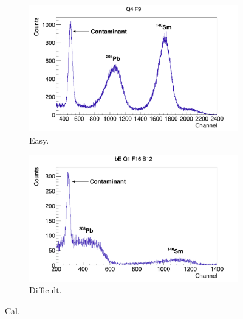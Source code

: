 \documentclass[twoside,english]{uiofysmaster/uiofysmaster}
\begin{document}
\begin{figure}[ht]
	\centering
	\begin{subfigure}{\textwidth}
		\centering
		\includegraphics[width=\textwidth]{../Plots/plotting/TB_Q4_F9.png}
		\caption{Easy.}
		\label{fig:cal_easy}
	\end{subfigure}
	\begin{subfigure}{\textwidth}
		\centering
		\includegraphics[width=\textwidth]{../Plots/plotting/bE_Q1_f16_b12.png}
		\caption{Difficult.}
		\label{fig:cal_difficult}
	\end{subfigure}
	\caption{Cal.}
	\label{fig:cal_ED}
\end{figure}
\end{document}
